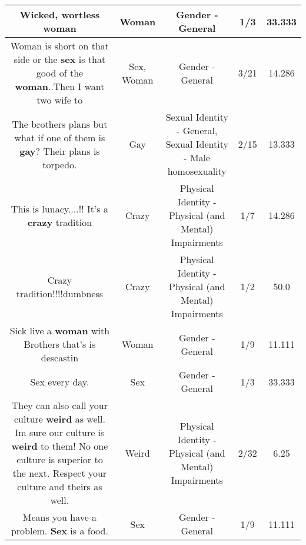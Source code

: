 \documentclass[11pt]{article}
\newlength\mylength
\begin{document}
\begin{center}
\begin{longtable}{|C{.65\mylength}|C{.30\mylength}|C{.12\mylength}|C{.12\mylength}|C{.12\mylength}|}
  \small Wicked, wortless woman\normalsize   & Woman & Gender - General & 1/3 & 33.333 \\  \hline
  \small Woman is short on that side or the \textbf{sex} is that good of the \textbf{woman}..Then I want two wife to\normalsize   & Sex, Woman & Gender - General & 3/21 & 14.286 \\  \hline
  \small The brothers plans but what if one of them is \textbf{g\textbf{ay}}? Their plans is torpedo.\normalsize   & Gay & Sexual Identity - General, Sexual Identity - Male homosexuality & 2/15 & 13.333 \\  \hline
  \small This is lunacy....!! It's a \textbf{crazy} tradition\normalsize   & Crazy & Physical Identity - Physical (and Mental) Impairments & 1/7 & 14.286 \\  \hline
  \small Crazy tradition!!!!dumbness\normalsize   & Crazy & Physical Identity - Physical (and Mental) Impairments & 1/2 & 50.0 \\  \hline
  \small Sick  live  a \textbf{woman} with  Brothers  that's  is descastin\normalsize   & Woman & Gender - General & 1/9 & 11.111 \\  \hline
  \small Sex every day.\normalsize   & Sex & Gender - General & 1/3 & 33.333 \\  \hline
  \small They can also call your culture \textbf{weird} as well. Im sure our culture is \textbf{weird} to them!  No one culture is superior to the next.  Respect your culture and theirs as well.\normalsize   & Weird & Physical Identity - Physical (and Mental) Impairments & 2/32 & 6.25 \\  \hline
  \small Means you have a problem. \textbf{Sex} is a food.\normalsize   & Sex & Gender - General & 1/9 & 11.111 \\  \hline

\end{longtable}
\end{center}
\end{document}
